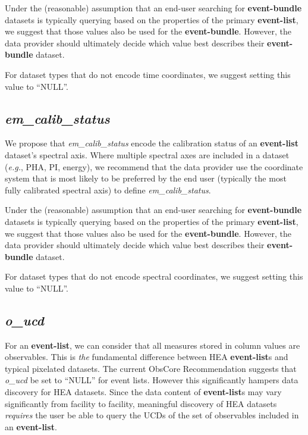 \documentclass[11pt,a4paper]{ivoa}
\begin{document}
Under the (reasonable) assumption that an end-user searching for {\bf event-bundle} datasets is typically querying based on the properties of the primary {\bf event-list}, we suggest that those values also be used for the {\bf event-bundle}.  However, the data provider should ultimately decide which value best describes their {\bf event-bundle} dataset.

For dataset types that do not encode time coordinates, we suggest setting this value to ``NULL''.

\subsection{{\em em\_calib\_status}}

We propose that {\em em\_calib\_status\/} encode the calibration status of an {\bf event-list} dataset's spectral axis.  Where multiple spectral axes are included in a dataset ({\em e.g.\/}, PHA, PI, energy), we recommend that the data provider use the coordinate system that is most likely to be preferred by the end user (typically the most fully calibrated spectral axis) to define {\em em\_calib\_status\/}.

Under the (reasonable) assumption that an end-user searching for {\bf event-bundle} datasets is typically querying based on the properties of the primary {\bf event-list}, we suggest that those values also be used for the {\bf event-bundle}.  However, the data provider should ultimately decide which value best describes their {\bf event-bundle} dataset.

For dataset types that do not encode spectral coordinates, we suggest setting this value to ``NULL''.

\subsection{{\em o\_ucd}}

For an {\bf event-list}, we can consider that all measures stored in column values are observables. This is {\em the\/} fundamental difference between \gls{HEA} {\bf event-list}s and typical pixelated datasets. The current ObsCore Recommendation suggests that {\em o\_ucd\/} be set to ``NULL'' for event lists. However this significantly hampers data discovery for \gls{HEA} datasets. Since the data content of {\bf event-list}s may vary significantly from facility to facility, meaningful discovery of \gls{HEA} datasets {\em requires\/} the user be able to query the UCDs of the set of observables included in an {\bf event-list}.
\end{document}
